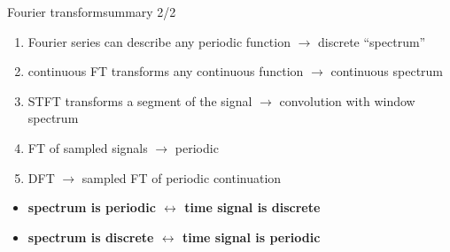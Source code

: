             \begin{frame}{Fourier transform}{summary 2/2}
                \begin{enumerate}
                    \item   Fourier series can describe any periodic function $\rightarrow$ discrete ``spectrum''
                    \item   continuous FT transforms any continuous function $\rightarrow$ continuous spectrum
                    \item   STFT transforms a segment of the signal $\rightarrow$ convolution with window spectrum
                    \item   FT of sampled signals $\rightarrow$ periodic
                    \item   DFT $\rightarrow$ sampled FT of periodic continuation
                \end{enumerate}
                    \pause
                \begin{itemize}
                    \item   \textbf{spectrum is periodic $\leftrightarrow$ time signal is discrete}
                    \item   \textbf{spectrum is discrete $\leftrightarrow$ time signal is periodic}
                \end{itemize}
            \end{frame}	
    


